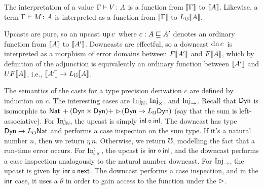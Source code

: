 The interpretation of a value ${\Gamma} \vdash {V} \colon {A}$ is a function from
$\llbracket {\Gamma} \rrbracket$ to $\llbracket {A} \rrbracket$. Likewise, a term ${\Gamma} \vdash {M} \colon {{A}}$ is
interpreted as a function from $\llbracket {\Gamma} \rrbracket$ to $L_\mho \llbracket {A} \rrbracket$.

Upcasts are pure, so an upcast $\text{up}\,{c}\,$ where $c : A \sqsubseteq A'$ denotes an
ordinary function from $\llbracket {A} \rrbracket$ to $\llbracket {A'} \rrbracket$. Downcasts are effectful, so a
downcast $\text{dn}\,{c}\,$ is interpreted as a morphism of error domains between
$F\llbracket {A'} \rrbracket$ and $F\llbracket {A} \rrbracket$, which by definition of the adjunction is
equivalently an ordinary function between $\llbracket {A'} \rrbracket$ and $UF\llbracket {A} \rrbracket$, i.e.,
$\llbracket {A'} \rrbracket \to L_\mho \llbracket {A} \rrbracket$.

The semantics of the casts for a type precision derivation $c$ are defined by
induction on $c$. The interesting cases are $\text{Inj}_\mathbb{N}$, $\text{Inj}_\times$, and $\text{Inj}_\to$.
Recall that $\mathsf{Dyn}$ is isomorphic to $\mathsf{Nat}\, + (\mathsf{Dyn} \times \mathsf{Dyn}) + \vartriangleright \hspace{-0.2em}
(\mathsf{Dyn} \to L_\mho \mathsf{Dyn})$ (say that the sum is left-associative).
%
For $\text{Inj}_\mathbb{N}$, the upcast is simply $\mathsf{inl} \circ \mathsf{inl}$. The downcast has type $\mathsf{Dyn}
\to L_\mho \mathsf{Nat}$ and performs a case inspection on the sum type. If it's a natural
number $n$, then we return $\eta\, n$. Otherwise, we return $\mho$, modelling
the fact that a run-time error occurs.
%
For $\text{Inj}_\times$, the upcast is $\mathsf{inr} \circ \mathsf{inl}$, and the downcast performs a case
inspection analogously to the natural number downcast.
%
For $\text{Inj}_\to$, the upcast is given by $\mathsf{inr} \circ \mathsf{next}$. The downcast performs a
case inspection, and in the $\mathsf{inr}$ case, it uses a $\theta$ in order to gain
access to the function under the $\vartriangleright$.
%




\vspace{2ex}


